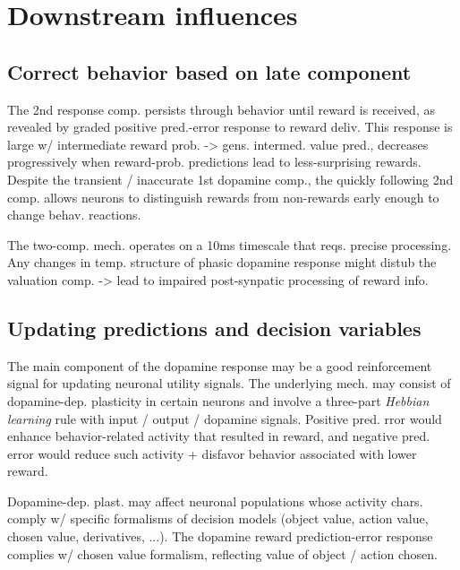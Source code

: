 \documentclass{article}
\numberwithin{equation}{section}
\begin{document}
\section{Downstream influences}
\subsection{Correct behavior based on late component}

The 2nd response comp. persists through behavior until reward is received, as revealed by graded positive pred.-error response to reward deliv. This response is large w/ intermediate reward prob. -> gens. intermed. value pred., decreases progressively when reward-prob. predictions lead to less-surprising rewards. Despite the transient / inaccurate 1st dopamine comp., the quickly following 2nd comp. allows neurons to distinguish rewards from non-rewards early enough to change behav. reactions.

The two-comp. mech. operates on a 10ms timescale that reqs. precise processing. Any changes in temp. structure of phasic dopamine response might distub the valuation comp. -> lead to impaired post-synpatic processing of reward info.

\subsection{Updating predictions and decision variables}

The main component of the dopamine response may be a good reinforcement signal for updating neuronal utility signals. The underlying mech. may consist of dopamine-dep. plasticity in certain neurons and involve a three-part \textit{Hebbian learning} rule with input / output / dopamine signals. Positive pred. rror would enhance behavior-related activity that resulted in reward, and negative pred. error would reduce such activity + disfavor behavior associated with lower reward.

Dopamine-dep. plast. may affect neuronal populations whose activity chars. comply w/ specific formalisms of decision models (object value, action value, chosen value, derivatives, ...). The dopamine reward prediction-error response complies w/ chosen value formalism, reflecting value of object / action chosen.
\end{document}
